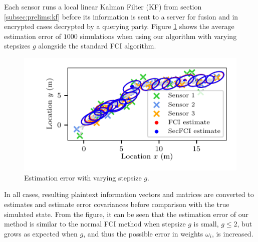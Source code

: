 Each sensor runs a local linear Kalman Filter (KF) from section \ref{subsec:prelims:kf} before its information is sent to a server for fusion and in encrypted cases decrypted by a querying party. Figure \ref{fig:cloud_fusion:secfci_sim_error} shows the average estimation error of $1000$ simulations when using our algorithm with varying stepsizes $g$ alongside the standard FCI algorithm. 
\begin{figure}[htbp]
    \centering
    \includegraphics{figures/fci_secfci_cmp.pdf}
    \caption{Estimation error with varying stepsize $g$.}
    \label{fig:cloud_fusion:secfci_sim_error}
 \end{figure}
 In all cases, resulting plaintext information vectors and matrices are converted to estimates and estimate error covariances before comparison with the true simulated state. From the figure, it can be seen that the estimation error of our method is similar to the normal FCI method when stepsize $g$ is small, $g\leq 2$, but grows as expected when $g$, and thus the possible error in weights $\omega_i$, is increased.

